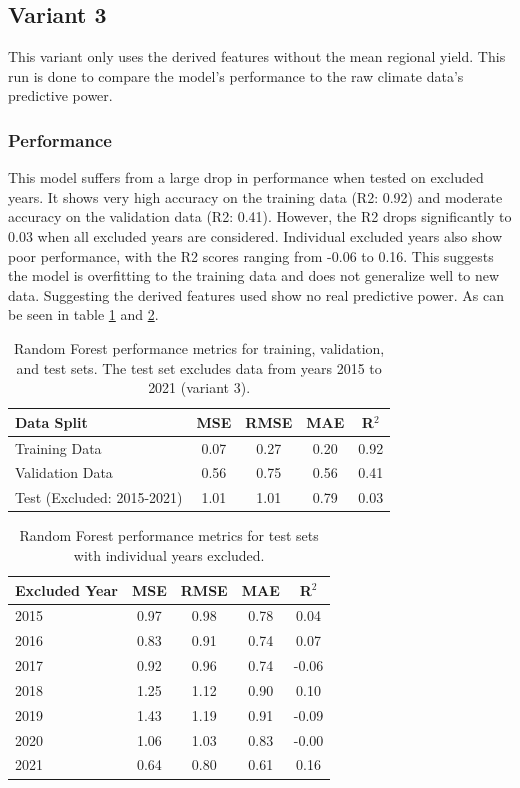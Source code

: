 \documentclass{article}
\begin{document}
\subsection{Variant 3}
This variant only uses the derived features without the mean regional yield. This run is done to compare the model's performance to the raw climate data's predictive power.
\subsubsection{Performance}
This model suffers from a large drop in performance when tested on excluded years. It shows very high accuracy on the training data (R2: 0.92) and moderate accuracy on the validation data (R2: 0.41). However, the R2 drops significantly to 0.03 when all excluded years are considered. Individual excluded years also show poor performance, with the R2 scores ranging from -0.06 to 0.16. This suggests the model is overfitting to the training data and does not generalize well to new data. Suggesting the derived features used show no real predictive power.
As can be seen in table \ref{table:errors_on_datasets_variant_3} and \ref{table:errors_on_datasets_years_variant_3}.
\begin{table}[H]
	\centering
	\begin{tabular}{lcccc}
		\hline
		Data Split                 & MSE  & RMSE & MAE  & R$^2$ \\
		\hline
		Training Data              & 0.07 & 0.27 & 0.20 & 0.92  \\
		Validation Data            & 0.56 & 0.75 & 0.56 & 0.41  \\
		Test (Excluded: 2015-2021) & 1.01 & 1.01 & 0.79 & 0.03  \\
		\hline
	\end{tabular}
	\caption{\label{table:errors_on_datasets_variant_3} Random Forest performance metrics for training, validation, and test sets. The test set excludes data from years 2015 to 2021 (variant 3).}
\end{table}

\begin{table}[H]
	\centering
	\begin{tabular}{lcccc}
		\hline
		Excluded Year & MSE  & RMSE & MAE  & R$^2$ \\
		\hline
		2015          & 0.97 & 0.98 & 0.78 & 0.04  \\
		2016          & 0.83 & 0.91 & 0.74 & 0.07  \\
		2017          & 0.92 & 0.96 & 0.74 & -0.06 \\
		2018          & 1.25 & 1.12 & 0.90 & 0.10  \\
		2019          & 1.43 & 1.19 & 0.91 & -0.09 \\
		2020          & 1.06 & 1.03 & 0.83 & -0.00 \\
		2021          & 0.64 & 0.80 & 0.61 & 0.16  \\
		\hline
	\end{tabular}
	\caption{\label{table:errors_on_datasets_years_variant_3} Random Forest performance metrics for test sets with individual years excluded.}
\end{table}
\end{document}
